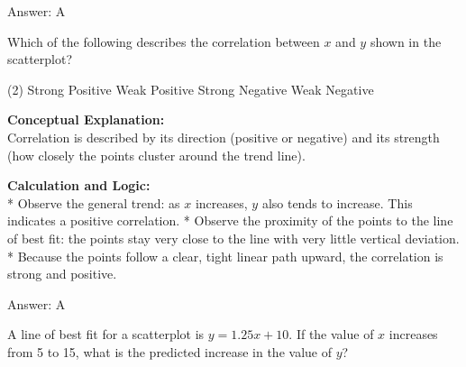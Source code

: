 \documentclass[11pt,paper=a4,answers]{exam}
\begin{document}
\begin{questions}
\begin{solution}
\vspace{30pt}

Answer: \colorbox{yellow!100}{A}
\end{solution}

\vspace{60pt}

\question
\begin{center}
\end{center}
Which of the following describes the correlation between $x$ and $y$ shown in the scatterplot?
\begin{tasks}(2)
    \task Strong Positive
    \task Weak Positive
    \task Strong Negative
    \task Weak Negative
\end{tasks}

\begin{solution}
\textbf{Conceptual Explanation:} \\
Correlation is described by its direction (positive or negative) and its strength (how closely the points cluster around the trend line).

\vspace{30pt}

\textbf{Calculation and Logic:} \\
* Observe the general trend: as $x$ increases, $y$ also tends to increase. This indicates a positive correlation.
* Observe the proximity of the points to the line of best fit: the points stay very close to the line with very little vertical deviation.
* Because the points follow a clear, tight linear path upward, the correlation is strong and positive.

\vspace{30pt}

Answer: \colorbox{yellow!100}{A}
\end{solution}

\vspace{60pt}

\question
A line of best fit for a scatterplot is $y = 1.25x + 10$. If the value of $x$ increases from 5 to 15, what is the predicted increase in the value of $y$?


\end{questions}
\end{document}
